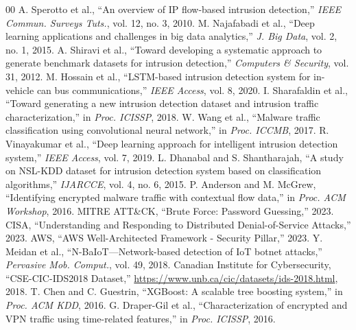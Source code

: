 \documentclass[conference]{IEEEtran}
\begin{document}
\FloatBarrier
\vspace{-2pt}

\begin{thebibliography}{00}
\small
{} A. Sperotto et al., ``An overview of IP flow-based intrusion detection,'' \textit{IEEE Commun. Surveys Tuts.}, vol. 12, no. 3, 2010.
 M. Najafabadi et al., ``Deep learning applications and challenges in big data analytics,'' \textit{J. Big Data}, vol. 2, no. 1, 2015.
 A. Shiravi et al., ``Toward developing a systematic approach to generate benchmark datasets for intrusion detection,'' \textit{Computers \& Security}, vol. 31, 2012.
 M. Hossain et al., ``LSTM-based intrusion detection system for in-vehicle can bus communications,'' \textit{IEEE Access}, vol. 8, 2020.
 I. Sharafaldin et al., ``Toward generating a new intrusion detection dataset and intrusion traffic characterization,'' in \textit{Proc. ICISSP}, 2018.
 W. Wang et al., ``Malware traffic classification using convolutional neural network,'' in \textit{Proc. ICCMB}, 2017.
 R. Vinayakumar et al., ``Deep learning approach for intelligent intrusion detection system,'' \textit{IEEE Access}, vol. 7, 2019.
 L. Dhanabal and S. Shantharajah, ``A study on NSL-KDD dataset for intrusion detection system based on classification algorithms,'' \textit{IJARCCE}, vol. 4, no. 6, 2015.
 P. Anderson and M. McGrew, ``Identifying encrypted malware traffic with contextual flow data,'' in \textit{Proc. ACM Workshop}, 2016.
 MITRE ATT\&CK, ``Brute Force: Password Guessing,'' 2023.
 CISA, ``Understanding and Responding to Distributed Denial-of-Service Attacks,'' 2023.
 AWS, ``AWS Well-Architected Framework - Security Pillar,'' 2023.
 Y. Meidan et al., ``N-BaIoT---Network-based detection of IoT botnet attacks,'' \textit{Pervasive Mob. Comput.}, vol. 49, 2018.
 Canadian Institute for Cybersecurity, ``CSE-CIC-IDS2018 Dataset,'' \url{https://www.unb.ca/cic/datasets/ids-2018.html}, 2018.
 T. Chen and C. Guestrin, ``XGBoost: A scalable tree boosting system,'' in \textit{Proc. ACM KDD}, 2016.
 G. Draper-Gil et al., ``Characterization of encrypted and VPN traffic using time-related features,'' in \textit{Proc. ICISSP}, 2016.
\end{thebibliography}
\end{document}
